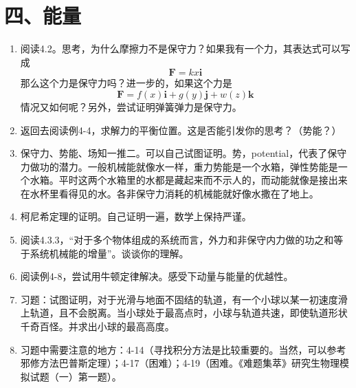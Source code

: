\documentclass[12pt,a4paper]{article}
\begin{document}
\section{四、能量}
\begin{enumerate}[label=\arabic*.,leftmargin=*]
    \item 阅读4.2。思考，为什么摩擦力不是保守力？如果我有一个力，其表达式可以写成
    \[
    \boldsymbol{F}=kx\boldsymbol{i}
    \]
    那么这个力是保守力吗？进一步的，如果这个力是
    \[
    \boldsymbol{F}=f(x)\boldsymbol{i}+g(y)\boldsymbol{j}+w(z)\boldsymbol{k}
    \]
    情况又如何呢？另外，尝试证明弹簧弹力是保守力。

    \item 返回去阅读例4-4，求解力的平衡位置。这是否能引发你的思考？（势能？）

    \item 保守力、势能、场知一推二。可以自己试图证明。势，potential，代表了保守力做功的潜力。一般机械能就像水一样，重力势能是一个水箱，弹性势能是一个水箱。平时这两个水箱里的水都是藏起来而不示人的，而动能就像是接出来在水杯里看得见的水。各非保守力消耗的机械能就好像水撒在了地上。

    \item 柯尼希定理的证明。自己证明一遍，数学上保持严谨。

    \item 阅读4.3.3，“对于多个物体组成的系统而言，外力和非保守内力做的功之和等于系统机械能的增量”。谈谈你的理解。

    \item 阅读例4-8，尝试用牛顿定律解决。感受下动量与能量的优越性。

    \item 习题：试图证明，对于光滑与地面不固结的轨道，有一个小球以某一初速度滑上轨道，且不会脱离。当小球处于最高点时，小球与轨道共速，即使轨道形状千奇百怪。并求出小球的最高高度。

    \item 习题中需要注意的地方：4-14（寻找积分方法是比较重要的。当然，可以参考邪修方法巴普斯定理）；4-17（困难）；4-19（困难。《难题集萃》研究生物理模拟试题（一）第一题）。
\end{enumerate}
\end{document}

